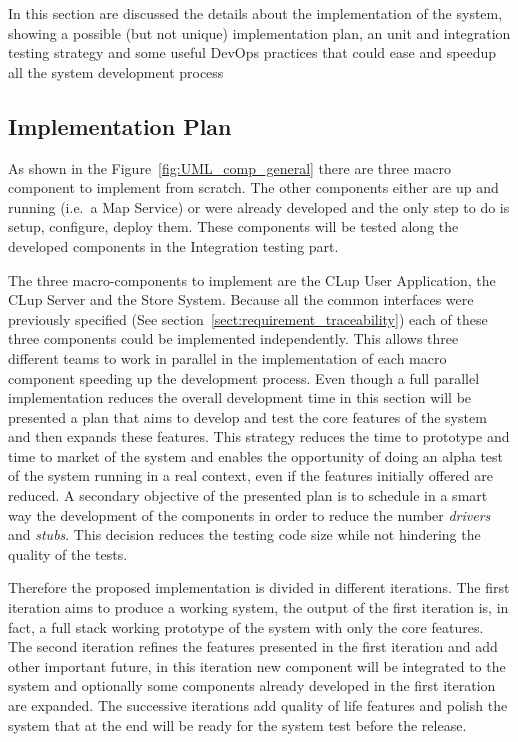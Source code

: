 In this section are discussed the details about the implementation of the system, showing a possible (but not unique) implementation plan, an unit and integration testing strategy and some useful DevOps practices that could ease and speedup all the system development process


\subsection{Implementation Plan}
As shown in the Figure~\ref{fig:UML_comp_general} there are three macro component to implement from scratch. The other components either are up and running (i.e.~a Map Service) or were already developed and the only step to do is setup, configure, deploy them. These components will be tested along the developed components in the Integration testing part.

The three macro-components to implement are the CLup User Application, the CLup Server and the Store System. Because all the common interfaces were previously specified (See section~\ref{sect:requirement_traceability}) each of these three components could be implemented independently. This allows three different teams to work in parallel in the implementation of each macro component speeding up the development process.
Even though a full parallel implementation reduces the overall development time in this section will be presented a plan that aims to develop and test the core features of the system and then expands these features. This strategy reduces the time to prototype and time to market of the system and enables the opportunity of doing an alpha test of the system running in a real context, even if the features initially offered are reduced. A secondary objective of the presented plan is to schedule in a smart way the development of the components in order to reduce the number \textit{drivers} and \textit{stubs}. This decision reduces the testing code size while not hindering the quality of the tests.

Therefore the proposed implementation is divided in different iterations. The first iteration aims to produce a working system, the output of the first iteration is, in fact, a full stack working prototype of the system with only the core features. The second iteration refines the features presented in the first iteration and add other important future, in this iteration new component will be integrated to the system and optionally some components already developed in the first iteration are expanded. The successive iterations add quality of life features and polish the system that at the end will be ready for the system test before the release.

